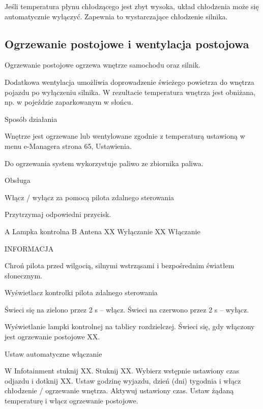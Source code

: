 Jeśli temperatura płynu chłodzącego jest zbyt wysoka, układ chłodzenia może się automatycznie wyłączyć. Zapewnia to wystarczające chłodzenie silnika.

\subsection{Ogrzewanie postojowe i wentylacja postojowa}

Ogrzewanie postojowe ogrzewa wnętrze samochodu oraz silnik.

Dodatkowa wentylacja umożliwia doprowadzenie świeżego powietrza do wnętrza pojazdu po wyłączeniu silnika. W rezultacie temperatura wnętrza jest
obniżana, np. w pojeździe zaparkowanym w słońcu.

Sposób działania

Wnętrze jest ogrzewane lub wentylowane zgodnie z temperaturą ustawioną w menu e-Managera \guillemotright strona 65, Ustawienia.

Do ogrzewania system wykorzystuje paliwo ze zbiornika paliwa.


Obsługa

Włącz / wyłącz za pomocą pilota zdalnego sterowania
\begin{itemizeArrow}
	\itemArrow Przytrzymaj odpowiedni przycisk.
\end{itemizeArrow}
A Lampka kontrolna
B Antena
XX Wyłączanie
XX Włączanie

INFORMACJA
\begin{itemizeTriangle}
	\itemTriangle Chroń pilota przed wilgocią, silnymi wstrząsami i bezpośrednim światłem słonecznym.
\end{itemizeTriangle}

Wyświetlacz kontrolki pilota zdalnego sterowania
\begin{itemizeTriangle}
	\itemTriangle Świeci się na zielono przez 2 s – włącz.
	\itemTriangle Świeci na czerwono przez 2 s – wyłącz.
\end{itemizeTriangle}

Wyświetlanie lampki kontrolnej na tablicy rozdzielczej.
Świeci się, gdy włączony jest ogrzewanie postojowe XX.

Ustaw automatyczne włączanie
\begin{itemizeArrow}
	\itemArrow W Infotainment stuknij XX.
	\itemArrow Stuknij XX.
	\itemArrow Wybierz wstępnie ustawiony czas odjazdu i dotknij XX.
	\itemArrow Ustaw godzinę wyjazdu, dzień (dni) tygodnia i włącz chłodzenie / ogrzewanie wnętrza.
	\itemArrow Aktywuj ustawiony czas.
	\itemArrow Ustaw żądaną temperaturę i włącz ogrzewanie postojowe.
\end{itemizeArrow}


